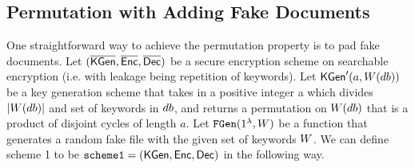 \subsection{Permutation with Adding Fake Documents}
One straightforward way to achieve the permutation property is to pad fake documents. Let $(\overline{\mathsf{KGen}}, \overline{\mathsf{Enc}}, \overline{\mathsf{Dec}})$ be a secure encryption scheme on searchable encryption (i.e. with leakage being repetition of keywords). Let $\mathsf{KGen}'(a, W(db))$ be a key generation scheme that takes in a positive integer a which divides $|W(db)|$ and set of keywords in $db$, and returns a permutation on $W(db)$ that is a product of disjoint cycles of length $a$. Let $\texttt{FGen}(1^{\lambda}, W)$ be a function that generates a random fake file with the given set of keywords $W$. We can define scheme 1 to be $\texttt{scheme1} = (\mathsf{KGen}, \mathsf{Enc}, \mathsf{Dec})$ in the following way.

\begin{pcvstack}[center]
\begin{pchstack}

\pchspace
{}
\end{pchstack}

\pcvspace
{}
\end{pcvstack}

